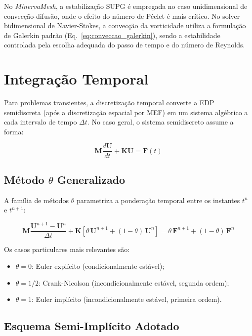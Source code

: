 No \textit{MinervaMesh}, a estabilização SUPG é empregada no caso unidimensional de convecção-difusão, onde o efeito do número de Péclet é mais crítico. No solver bidimensional de Navier-Stokes, a convecção da vorticidade utiliza a formulação de Galerkin padrão (Eq.~\ref{eq:conveccao_galerkin}), sendo a estabilidade controlada pela escolha adequada do passo de tempo e do número de Reynolds.

\section{Integração Temporal}
\label{sec:integracao_temporal}

Para problemas transientes, a discretização temporal converte a EDP semidiscreta (após a discretização espacial por MEF) em um sistema algébrico a cada intervalo de tempo $\Delta t$. No caso geral, o sistema semidiscreto assume a forma:

\begin{equation}
\mathbf{M} \frac{d\mathbf{U}}{dt} + \mathbf{K} \mathbf{U} = \mathbf{F}(t)
\label{eq:semidiscreto}
\end{equation}

\subsection{Método $\theta$ Generalizado}

A família de métodos $\theta$ parametriza a ponderação temporal entre os instantes $t^n$ e $t^{n+1}$:

\begin{equation}
\mathbf{M} \frac{\mathbf{U}^{n+1} - \mathbf{U}^n}{\Delta t} + \mathbf{K} \left[ \theta \, \mathbf{U}^{n+1} + (1 - \theta) \, \mathbf{U}^n \right] = \theta \, \mathbf{F}^{n+1} + (1 - \theta) \, \mathbf{F}^n
\label{eq:theta_method}
\end{equation}

Os casos particulares mais relevantes são:
\begin{itemize}
    \item $\theta = 0$: Euler explícito (condicionalmente estável);
    \item $\theta = 1/2$: Crank-Nicolson (incondicionalmente estável, segunda ordem);
    \item $\theta = 1$: Euler implícito (incondicionalmente estável, primeira ordem).
\end{itemize}

\subsection{Esquema Semi-Implícito Adotado}
\label{sec:semi_implicito}

